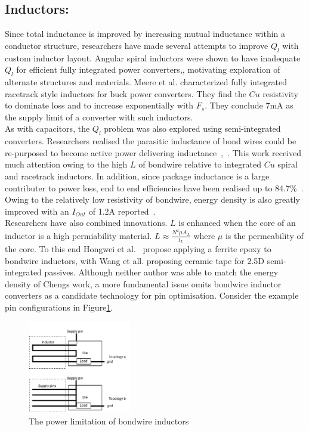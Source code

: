 \documentclass[letterpaper,twocolumn,10pt]{article}
\begin{document}
\subsection{Inductors: }Since total inductance is improved by increasing mutual inductance within a conductor structure, researchers have made several attempts to improve $Q_l$ with custom inductor layout. Angular spiral inductors were shown to have inadequate $Q_l$ for efficient fully integrated power converters\cite{Alimadadi2008},\cite{Artillan2011}, motivating exploration of alternate structures and materials. Meere et al. \cite{Meere2009} characterized fully integrated racetrack style inductors for buck power converters. They find the $Cu$ resistivity to dominate loss and to increase exponentially with $F_s$. They conclude 7mA as the supply limit of a converter with such inductors.\\
As with capacitors, the $Q_l$ problem was also explored using semi-integrated converters. Researchers realised the parasitic inductance of bond wires could be re-purposed to become active power delivering inductance~\cite{Wens2007},~\cite{Ahn2012}. This work received much attention owing to the high $L$ of bondwire relative to integrated $Cu$ spiral and racetrack inductors. In addition, since package inductance is a large contributer to power loss, end to end efficiencies have been realised up to 84.7\%~\cite{Cheng2013}. Owing to the relatively low resistivity of bondwire, energy density is also greatly improved with an $I_{Out}$ of 1.2A reported~\cite{Cheng2013}.\\
\indent Researchers have also combined innovations. $L$ is enhanced when the core of an inductor is a high permiability material. $L \approx \frac{N^2\mu A_L}{l_L}$ where $\mu$ is the permeability of the core. To this end Hongwei et al.~\cite{Hongwei2011} propose applying a ferrite epoxy to bondwire inductors, with Wang et all. proposing ceramic tape for 2.5D semi-integrated passives. Although neither author was able to match the energy density of Chengs work, a more fundamental issue omits bondwire inductor converters as a candidate technology for pin optimisation. Consider the example pin configurations in Figure\ref{BondWireLim}.
    
\begin{figure}[here]
\includegraphics[width=0.4\textwidth]{CostvsGainofBondWireInductor}
\caption{The power limitation of bondwire inductors}
\label{BondWireLim}
\end{figure}
\end{document}
